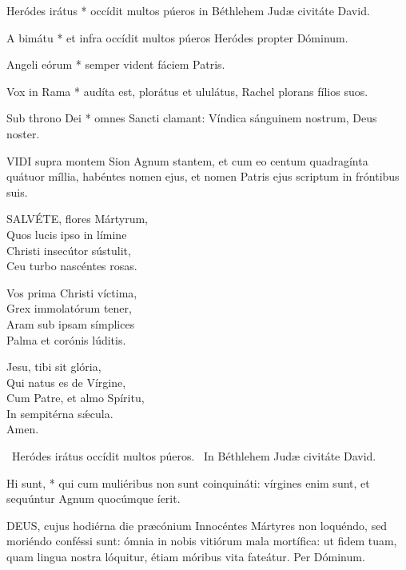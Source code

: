 

 Heródes irátus * occídit multos púeros in Béthlehem Judæ civitáte David.

 A bimátu * et infra occídit multos púeros Heródes propter Dóminum.

 Angeli eórum * semper vident fáciem Patris.

 Vox in Rama * audíta est, plorátus et ululátus, Rachel plorans fílios suos.

 Sub throno Dei * omnes Sancti clamant: Víndica sánguinem nostrum, Deus noster.


\lettrine[lines=2]{V}{IDI} supra montem Sion Agnum stantem, et cum eo centum quadragínta quátuor míllia, habéntes nomen ejus, et nomen Patris ejus scriptum in fróntibus suis.


\lettrine[lines=2]{S}{ALVÉTE}, flores Mártyrum,\\
Quos lucis ipso in límine\\
Christi insecútor sústulit,\\
Ceu turbo nascéntes rosas.

Vos prima Christi víctima,\\
Grex immolatórum tener,\\
Aram sub ipsam símplices\\
Palma et corónis lúditis.

Jesu, tibi sit glória,\\
Qui natus es de Vírgine,\\
Cum Patre, et almo Spíritu,\\
In sempitérna sǽcula.\\
Amen.

\V\ Heródes irátus occídit multos púeros. \R\ In Béthlehem Judæ civitáte David.

 Hi sunt, * qui cum muliéribus non sunt coinquináti: vírgines enim sunt, et sequúntur Agnum quocúmque íerit.


\lettrine[lines=2]{D}{EUS}, cujus hodiérna die præcónium Innocéntes Mártyres non loquéndo, sed moriéndo conféssi sunt: ómnia in nobis vitiórum mala mortífica: ut fidem tuam, quam lingua nostra lóquitur, étiam móribus vita fateátur. Per Dóminum.

